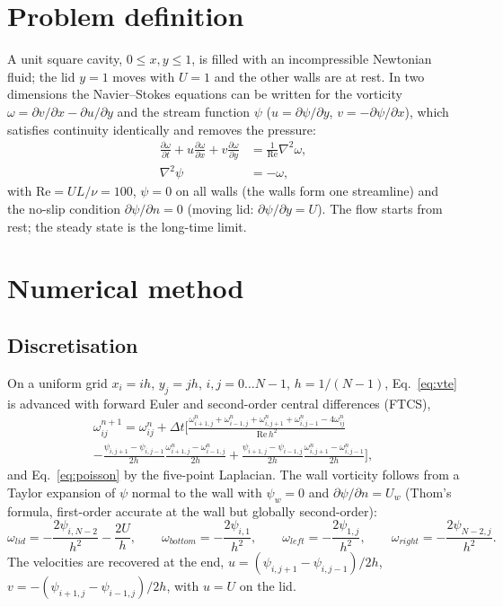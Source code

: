 \section{Problem definition}
A unit square cavity, $0\le x,y\le1$, is filled with an incompressible Newtonian fluid; the lid $y=1$ moves with $U=1$ and the other walls are at rest. In two dimensions the Navier--Stokes equations can be written for the vorticity $\omega=\partial v/\partial x-\partial u/\partial y$ and the stream function $\psi$ ($u=\partial\psi/\partial y$, $v=-\partial\psi/\partial x$), which satisfies continuity identically and removes the pressure:
\begin{align}
\frac{\partial\omega}{\partial t}+u\frac{\partial\omega}{\partial x}+v\frac{\partial\omega}{\partial y}&=\frac{1}{\mathrm{Re}}\nabla^2\omega, \label{eq:vte}\\
\nabla^2\psi&=-\omega, \label{eq:poisson}
\end{align}
with $\mathrm{Re}=UL/\nu=100$, $\psi=0$ on all walls (the walls form one streamline) and the no-slip condition $\partial\psi/\partial n=0$ (moving lid: $\partial\psi/\partial y=U$). The flow starts from rest; the steady state is the long-time limit.

\section{Numerical method}
\subsection{Discretisation}
On a uniform grid $x_i=ih$, $y_j=jh$, $i,j=0\ldots N-1$, $h=1/(N-1)$, Eq.~\eqref{eq:vte} is advanced with forward Euler and second-order central differences (FTCS),
\begin{multline}
\omega^{n+1}_{ij}=\omega^n_{ij}+\Delta t\Big[\frac{\omega^n_{i+1,j}+\omega^n_{i-1,j}+\omega^n_{i,j+1}+\omega^n_{i,j-1}-4\omega^n_{ij}}{\mathrm{Re}\,h^2}\\
-\frac{\psi_{i,j+1}-\psi_{i,j-1}}{2h}\frac{\omega^n_{i+1,j}-\omega^n_{i-1,j}}{2h}+\frac{\psi_{i+1,j}-\psi_{i-1,j}}{2h}\frac{\omega^n_{i,j+1}-\omega^n_{i,j-1}}{2h}\Big],
\end{multline}
and Eq.~\eqref{eq:poisson} by the five-point Laplacian. The wall vorticity follows from a Taylor expansion of $\psi$ normal to the wall with $\psi_w=0$ and $\partial\psi/\partial n=U_w$ (Thom's formula, first-order accurate at the wall but globally second-order):
\begin{equation}
\omega_{lid}=-\frac{2\psi_{i,N-2}}{h^2}-\frac{2U}{h},\qquad \omega_{bottom}=-\frac{2\psi_{i,1}}{h^2},\qquad \omega_{left}=-\frac{2\psi_{1,j}}{h^2},\qquad \omega_{right}=-\frac{2\psi_{N-2,j}}{h^2}.
\end{equation}
The velocities are recovered at the end, $u=(\psi_{i,j+1}-\psi_{i,j-1})/2h$, $v=-(\psi_{i+1,j}-\psi_{i-1,j})/2h$, with $u=U$ on the lid.

